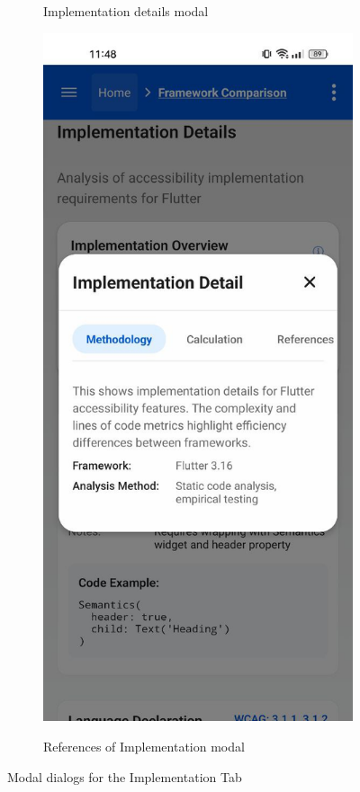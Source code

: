 \begin{figure}[ht]
\begin{subfigure}[b]{0.48\textwidth}
        \caption{Implementation details modal}
        \label{fig:implementation-details-dialog}
    \end{subfigure}
    \hfill
    \begin{subfigure}[b]{0.48\textwidth}
        \centering
        \includegraphics[width=\linewidth, alt={Modal dialog showing academic references for Implementation tab section}]{img/implementation-methodology.jpg}
        \caption{References of Implementation modal}
        \label{fig:academic-references-dialog}
    \end{subfigure}
    \caption{Modal dialogs for the Implementation Tab}
    \label{fig:modal_accessibility}
\end{figure}

